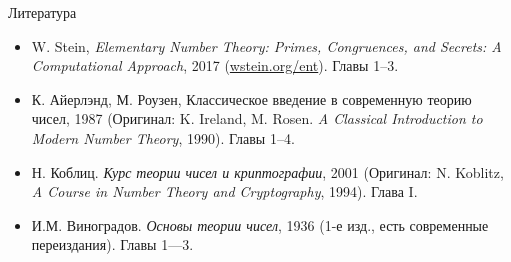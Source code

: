 \documentclass[serif, aspectratio=169]{beamer}
\begin{document}
\begin{frame}{Литература}
    \begin{itemize}[<.->]
        \item W. Stein, \textit{Elementary Number Theory: Primes, Congruences, and Secrets: A Computational Approach}, 2017 (\href{https://wstein.org/ent/}{wstein.org/ent}). Главы 1--3.
        \item К. Айерлэнд, М. Роузен, Классическое введение в современную теорию чисел, 1987 (Оригинал: K. Ireland, M. Rosen. \textit{A Classical Introduction to Modern Number Theory}, 1990). Главы 1--4.
        \item Н. Коблиц. \textit{Курс теории чисел и криптографии}, 2001 (Оригинал: N. Koblitz, \textit{A Course in Number Theory and Cryptography}, 1994). Глава I.
        \item И.М. Виноградов. \textit{Основы теории чисел}, 1936 (1-е изд., есть современные переиздания). Главы 1---3.
    \end{itemize}
\end{frame}
\end{document}

